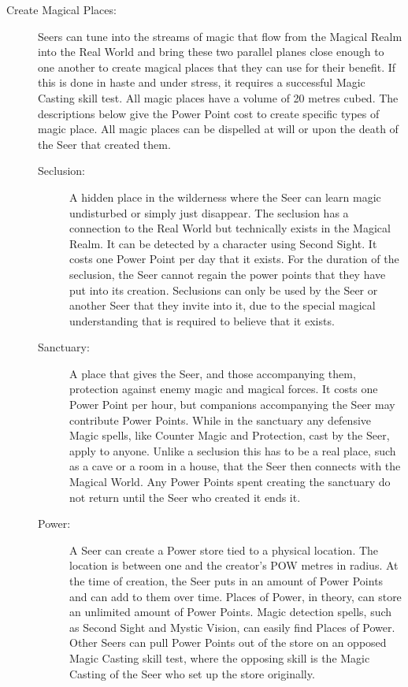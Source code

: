 \begin{description}
\item[Create Magical Places:] Seers can tune into the streams of magic that flow from the Magical Realm into the Real World and bring these two parallel planes close enough to one another to create magical places that they can use for their benefit. If this is done in haste and under stress, it requires a successful Magic Casting skill test. All magic places have a volume of 20 metres cubed. The descriptions below give the Power Point cost to create specific types of magic place. All magic places can be dispelled at will or upon the death of the Seer that created them.
\begin{description}
\item[Seclusion:] A hidden place in the wilderness where the Seer can learn magic undisturbed or simply just disappear. The seclusion has a connection to the Real World but technically exists in the Magical Realm. It can be detected by a character using Second Sight. It costs one Power Point per day that it exists. For the duration of the seclusion, the Seer cannot regain the power points that they have put into its creation. Seclusions can only be used by the Seer or another Seer that they invite into it, due to the special magical understanding that is required to believe that it exists.
\item[Sanctuary:] A place that gives the Seer, and those accompanying them, protection against enemy magic and magical forces. It costs one Power Point per hour, but companions accompanying the Seer may contribute Power Points. While in the sanctuary any defensive Magic spells, like Counter Magic and Protection, cast by the Seer, apply to anyone. Unlike a seclusion this has to be a real place, such as a cave or a room in a house, that the Seer then connects with the Magical World. Any Power Points spent creating the sanctuary do not return until the Seer who created it ends it.
\item[Power:] A Seer can create a Power store tied to a physical location. The location is between one and the creator’s POW metres in radius. At the time of creation, the Seer puts in an amount of Power Points and can add to them over time. Places of Power, in theory, can store an unlimited amount of Power Points. Magic detection spells, such as Second Sight and Mystic Vision, can easily find Places of Power. Other Seers can pull Power Points out of the store on an opposed Magic Casting skill test, where the opposing skill is the Magic Casting of the Seer who set up the store originally.
\end{description}
\end{description}


